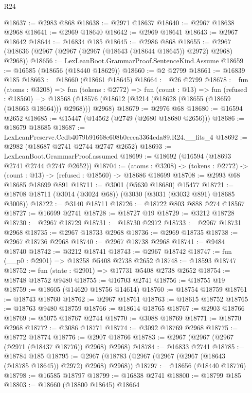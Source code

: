 \begin{lexlean}{R24}
\begin{coremodule}
@18637 := @2983 @868
@18638 := @2971 @18637
@18640 := @2967 @18638 @2968
@18641 := @2969 @18640
@18642 := @2969 @18641
@18643 := @2967 @18642
@18644 := @16834 @185
@18645 := @2986 @868
@18655 := @2967 (@18636 (@2967 (@2967 (@2967 (@18643 (@18644 @18645)) @2972) @2968) @2968))
@18656 := LexLeanBoot.GrammarProof.SentenceKind.Assume
@18659 := @16585 (@18656 (@18440 @18629))
@18660 := @2 @2799
@18661 := @16839 @185
@18663 := @18660 (@18661 @18645)
@18664 := @26 @2799
@18678 := fun (atoms : @3208) =>
  fun (tokens : @2772) =>
  fun (count : @13) =>
  fun (refused : @18560) =>
  @18568 (@18576 (@18612 (@3214 (@18628 (@18655 (@18659 (@18663 @18664))) @2968))) @2968)
@18679 := @2976 @68
@18680 := @16594 @2652
@18685 := @15447 (@14562 (@2749 (@2680 @18680 @2656)))
@18686 := @18679 @18685
@18687 := LexLeanPreserve.Ccdb4079b91668e608b0ecca3364cda89.R24.__fits_4
@18692 := @2982 (@18687 @2741 @2744 @2747 @2652)
@18693 := LexLeanBoot.GrammarProof.assumed
@18699 := @18692 (@16594 (@18693 @2741 @2744 @2747 @2652))
@18704 := (atoms : @3208) ->
  (tokens : @2772) -> (count : @13) -> (refused : @18560) -> @18686 @18699
@18708 := @2993 @68 @18685 @18699 @891
@18711 := @3001 (@5630 @18680) @15477
@18721 := @18708 @18711 (@3014 (@3024 @68)) (@3030 (@3031 (@3032 @891) @18685 @3008))
@18722 := @3140 @18711
@18726 := @18722 @803 @888 @274 @18567
@18727 := @16699 @2741
@18728 := @18727 @19
@18729 := @3212 @18728
@18730 := @2967 @18729
@18731 := @18730 @2972
@18733 := @2967 @18731 @2968
@18735 := @2967 @18733 @2968
@18736 := @2969 @18735
@18738 := @2967 @18736 @2968
@18740 := @2967 @18738 @2968
@18741 := @9484 @18740
@18742 := @3212 @18741
@18743 := @2967 @18742
@18747 := fun (__p0 : @2901) => @18258 @5408 @2738 @2652
@18748 := @18593 @18747
@18752 := fun (state : @2901) => @17731 @5408 @2738 @2652
@18754 := @18748 @18752 @9480
@18755 := @16703 @2741
@18756 := @18755 @19
@18759 := @18605 (@14620 @18756 @14614)
@18760 := @18754 @18759
@18761 := @18743 @18760
@18762 := @2967 @18761
@18763 := @18615 @18752
@18765 := @18763 @9480 @18759
@18766 := @18614 @18765
@18767 := @2903 @18766
@18769 := @5075 @18767 @2744
@18770 := @3088 @18769
@18771 := @18770 @2968
@18772 := @3086 @18771
@18774 := @3092 @18769 @2968
@18775 := @18772 @18774
@18776 := @2907 @18766
@18783 := @2967 (@2967 (@2967 (@2971 (@18437 @18776)) @2968) @2968)
@18784 := @16833 @2741
@18785 := @18784 @185
@18795 := @2967 (@18783 (@2967 (@2967 (@2967 (@18643 (@18785 @18645)) @2972) @2968) @2968))
@18797 := @18656 (@18440 @18776)
@18798 := @16585 @18797
@18799 := @16838 @2741
@18800 := @18799 @185
@18803 := @18660 (@18800 @18645) @18664

\end{coremodule}
\end{lexlean}
